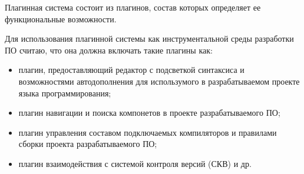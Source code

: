 Плагинная система состоит из плагинов, состав которых определяет ее функциональные возможности.

Для использования плагинной системы как инструментальной среды разработки ПО считаю, что она должна включать такие плагины как:
\begin{itemize}
    \item плагин, предоставляющий редактор с подсветкой синтаксиса и возможностями автодополнения для использумого в разрабатываемом проекте языка программирования;
    \item плагин навигации и поиска компонетов в проекте разрабатываемого ПО;
    \item плагин управления составом подключаемых компиляторов и правилами сборки проекта разрабатываемого ПО;
    \item плагин взаимодействия с системой контроля версий (СКВ) и др.
\end{itemize}